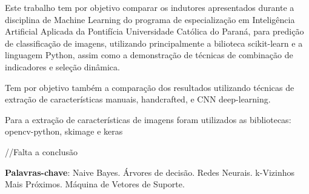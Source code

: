 \documentclass[
article,			%
11pt,				%
oneside,			%
a4paper,			%
english,			%
brazil,				%
sumario=tradicional,
]{abntex2}
\begin{document}
	
	
	\frenchspacing 
	
	
	
	\maketitle
	
	
	
	
	
	\begin{resumoumacoluna}
		Este trabalho tem por objetivo comparar os indutores apresentados durante a disciplina de Machine Learning do programa de especialização em Inteligência Artificial Aplicada da Pontifícia Universidade Católica do Paraná, para predição de classificação de imagens, utilizando principalmente a bilioteca scikit-learn e a linguagem Python, assim como a demonstração de técnicas de combinação de indicadores e seleção dinâmica.

		Tem por objetivo também a comparação dos resultados utilizando técnicas de extração de características manuais, handcrafted, e CNN deep-learning.

		Para a extração de características de imagens foram utilizados as bibliotecas: opencv-python, skimage e keras

		//Falta a conclusão
		
		\vspace{\onelineskip}
		
		\noindent
		\textbf{Palavras-chave}: Naive Bayes. Árvores de decisão. Redes Neurais. k-Vizinhos Mais Próximos. Máquina de Vetores de Suporte.
	\end{resumoumacoluna}
	
\end{document}
